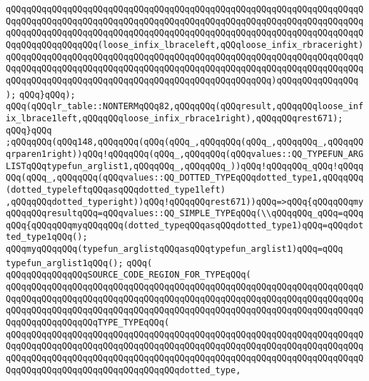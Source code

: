 \verb|qQQqqQQqqQQqqQQqqQQqqQQqqQQqqQQqqQQqqQQqqQQqqQQqqQQqqQQqqQQqqQQqqQQqqQQqqQQqqQQqqQQqqQQqqQQqqQQqqQQqqQQqqQQqqQQqqQQqqQQqqQQqqQQqqQQqqQQqqQQqqQQqqQQqqQQqqQQqqQQqqQQqqQQqqQQqqQQqqQQqqQQqqQQqqQQqqQQqqQQqqQQqqQQqqQQqqQQqqQQqqQQqqQQq(loose_infix_lbraceleft,qQQqloose_infix_rbraceright)|\newline
\verb|qQQqqQQqqQQqqQQqqQQqqQQqqQQqqQQqqQQqqQQqqQQqqQQqqQQqqQQqqQQqqQQqqQQqqQQqqQQqqQQqqQQqqQQqqQQqqQQqqQQqqQQqqQQqqQQqqQQqqQQqqQQqqQQqqQQqqQQqqQQqqQQqqQQqqQQqqQQqqQQqqQQqqQQqqQQqqQQqqQQqqQQqqQQqqQQq)qQQqqQQqqQQqqQQq|\newline
\verb|);|\newline
\verb|qQQq}qQQq);|\newline
\verb|qQQq(qQQqlr_table::NONTERMqQQq82,qQQqqQQq(qQQqresult,qQQqqQQqloose_infix_lbrace1left,qQQqqQQqloose_infix_rbrace1right),qQQqqQQqrest671);|\newline
\verb|qQQq}qQQq|\newline
\verb|;qQQqqQQq(qQQq148,qQQqqQQq(qQQq(qQQq_,qQQqqQQq(qQQq_,qQQqqQQq_,qQQqqQQqrparen1right))qQQq!qQQqqQQq(qQQq_,qQQqqQQq(qQQqvalues::QQ_TYPEFUN_ARGLISTqQQqtypefun_arglist1,qQQqqQQq_,qQQqqQQq_))qQQq!qQQqqQQq_qQQq!qQQqqQQq(qQQq_,qQQqqQQq(qQQqvalues::QQ_DOTTED_TYPEqQQqdotted_type1,qQQqqQQq(dotted_typeleftqQQqasqQQqdotted_type1left)|\newline
\verb|,qQQqqQQqdotted_typeright))qQQq!qQQqqQQqrest671))qQQq=>qQQq{qQQqqQQqmyqQQqqQQqresultqQQq=qQQqvalues::QQ_SIMPLE_TYPEqQQq(\\qQQqqQQq_qQQq=qQQqqQQq{qQQqqQQqmyqQQqqQQq(dotted_typeqQQqasqQQqdotted_type1)qQQq=qQQqdotted_type1qQQq();|\newline
\verb|qQQqmyqQQqqQQq(typefun_arglistqQQqasqQQqtypefun_arglist1)qQQq=qQQq|\newline
\verb|typefun_arglist1qQQq();|\newline
\verb|qQQq(|\newline
\verb|qQQqqQQqqQQqqQQqSOURCE_CODE_REGION_FOR_TYPEqQQq(|\newline
\verb|qQQqqQQqqQQqqQQqqQQqqQQqqQQqqQQqqQQqqQQqqQQqqQQqqQQqqQQqqQQqqQQqqQQqqQQqqQQqqQQqqQQqqQQqqQQqqQQqqQQqqQQqqQQqqQQqqQQqqQQqqQQqqQQqqQQqqQQqqQQqqQQqqQQqqQQqqQQqqQQqqQQqqQQqqQQqqQQqqQQqqQQqqQQqqQQqqQQqqQQqqQQqqQQqqQQqqQQqqQQqqQQqqQQqTYPE_TYPEqQQq(|\newline
\verb|qQQqqQQqqQQqqQQqqQQqqQQqqQQqqQQqqQQqqQQqqQQqqQQqqQQqqQQqqQQqqQQqqQQqqQQqqQQqqQQqqQQqqQQqqQQqqQQqqQQqqQQqqQQqqQQqqQQqqQQqqQQqqQQqqQQqqQQqqQQqqQQqqQQqqQQqqQQqqQQqqQQqqQQqqQQqqQQqqQQqqQQqqQQqqQQqqQQqqQQqqQQqqQQqqQQqqQQqqQQqqQQqqQQqqQQqqQQqqQQqqQQqdotted_type,|\newline
